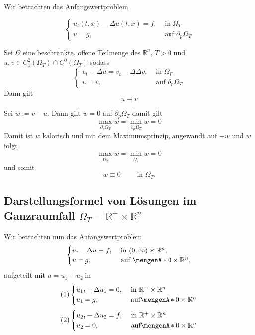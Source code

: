 
Wir betrachten das Anfangswertproblem

\[
	\begin{cases}
		u_t(t,x) - \Delta u(t,x) = f, &\text{ in }\Omega_T\\
		u = g, &\text{ auf }\partial_p \Omega_T
	\end{cases}
\]

\begin{korollar}[Eindeutigkeit]
	Sei $\Omega$ eine beschränkte, offene Teilmenge des $\mathbb{R}^n$, $T>0$ und \\ $u,v \in C_1^2(\Omega_T) \cap C^0(\Omega_T)$ sodass
	\[
		\begin{cases}
			u_t- \Delta u = v_t - \Delta \Delta v, &\text{ in }\Omega_T\\
			u = v ,&\text{ auf } \partial_p \Omega_T
		\end{cases}
	\]
	Dann gilt \[
		u \equiv v
	\]
\end{korollar}
\begin{beweis}
	Sei $w:= v-u$. Dann gilt $w=0$ auf $ \partial_p \Omega_T$ damit gilt
	\[
		\max_{ \partial_p \Omega_T} w = \min_{ \partial_p \Omega_T} w = 0
	\]
	Damit ist $w$ kalorisch und mit dem Maximumsprinzip, angewandt auf $-w$ und $w$ folgt
	\[
		\max_{\bar{\Omega_T}} w = \min_{\bar{\Omega_T}} w = 0
	\]
	und somit
	\[
		w \equiv 0 \qquad \text{ in } \Omega_T.
	\]
\end{beweis}

\subsection{Darstellungsformel von Lösungen im Ganzraumfall $\Omega_T = \mathbb{R}^{+} \times \mathbb{R}^n$} 
\label{sub:darstellungsformel_von_losungen_im_ganzraumfall_omega_t_mathbb_r_times_mathbb_r_n}
Wir betrachten nun das Anfangswertproblem 
\[
	\begin{cases}
		u_t - \Delta u = f , &\text{ in }(0,\infty) \times \mathbb{R}^n,\\
		u = g, &\text{ auf } \set{0} \times \mathbb{R}^n,
	\end{cases}
\]
aufgeteilt mit $u = u_1 + u_2$ in 
\[
	(1)\begin{cases}
		{u_1}_t - \Delta u_1 = 0, &\text{ in }\mathbb{R}^{+} \times \mathbb{R}^n\\
		u_1 = g, &\text{ auf} \set{0} \times \mathbb{R}^n
	\end{cases}
\]
\[
	(2)\begin{cases}
		{u_2}_t - \Delta u_2 = f, &\text{ in }\mathbb{R}^{+} \times \mathbb{R}^n\\
		u_2 = 0, &\text{ auf} \set{0} \times \mathbb{R}^n
	\end{cases}
\]

